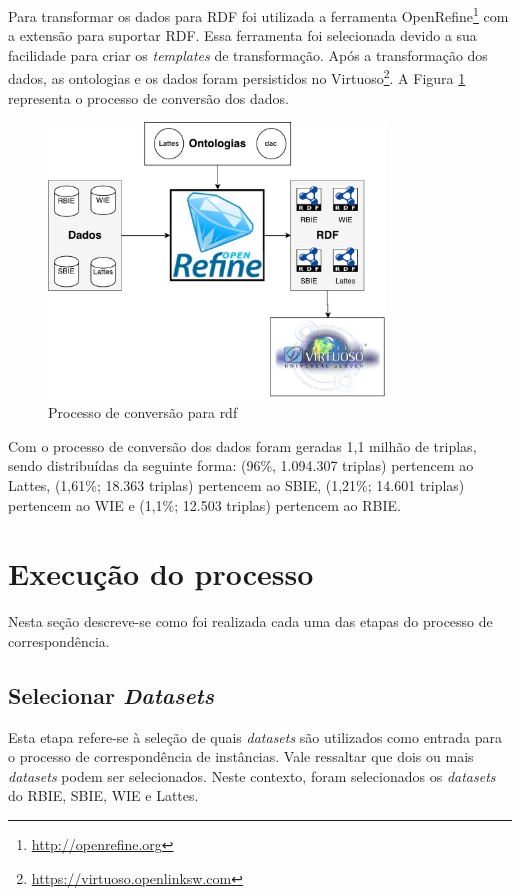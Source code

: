 Para transformar os dados para RDF foi utilizada a ferramenta OpenRefine\footnote{\url{http://openrefine.org}} com a extensão para suportar RDF. Essa ferramenta foi selecionada devido a sua facilidade para criar os \textit{templates} de transformação. Após a transformação dos dados, as ontologias e os dados foram persistidos no Virtuoso\footnote{\url{https://virtuoso.openlinksw.com}}. A Figura \ref{fig:conversao} representa o processo de conversão dos dados.

\begin{figure}[!ht]
	\centering
	\includegraphics[width=0.8\textwidth]{./imagens/conversao.pdf}
	\caption{Processo de conversão para rdf}
	\label{fig:conversao}
\end{figure}

Com o processo de conversão dos dados foram geradas 1,1 milhão de triplas, sendo distribuídas da seguinte forma: (96\%, 1.094.307 triplas) pertencem ao Lattes, (1,61\%; 18.363 triplas) pertencem ao SBIE, (1,21\%; 14.601 triplas) pertencem ao WIE e (1,1\%; 12.503 triplas) pertencem ao RBIE.

\newpage
\section{Execução do processo}
\label{sec:exec_processo}
Nesta seção descreve-se como foi realizada cada uma das etapas do processo de correspondência. 

\subsection{Selecionar \textit{Datasets}}
\label{sub:selecionar_datasets}
Esta etapa refere-se à seleção de quais \textit{datasets} são utilizados como entrada para o processo de correspondência de instâncias. Vale ressaltar que dois ou mais \textit{datasets} podem ser selecionados. Neste contexto, foram selecionados os \textit{datasets} do RBIE, SBIE, WIE e Lattes.
  
